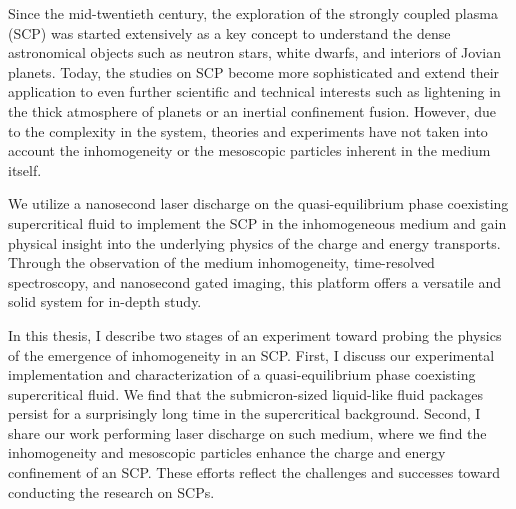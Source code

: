 
Since the mid-twentieth century, the exploration of the strongly coupled plasma (SCP) was started extensively as a key concept to understand the dense astronomical objects such as neutron stars, white dwarfs, and interiors of Jovian planets. Today, the studies on SCP become more sophisticated and extend their application to even further scientific and technical interests such as lightening in the thick atmosphere of planets or an inertial confinement fusion. However, due to the complexity in the system, theories and experiments have not taken into account the inhomogeneity or the mesoscopic particles inherent in the medium itself.

We utilize a nanosecond laser discharge on the quasi-equilibrium phase coexisting supercritical fluid to implement the SCP in the inhomogeneous medium and gain physical insight into the underlying physics of the charge and energy transports. Through the observation of the medium inhomogeneity, time-resolved spectroscopy, and nanosecond gated imaging, this platform offers a versatile and solid system for in-depth study.

In this thesis, I describe two stages of an experiment toward probing the physics of the emergence of inhomogeneity in an SCP. First, I discuss our experimental implementation and characterization of a quasi-equilibrium phase coexisting supercritical fluid. We find that the submicron-sized liquid-like fluid packages persist for a surprisingly long time in the supercritical background. Second, I share our work performing laser discharge on such medium, where we find the inhomogeneity and mesoscopic particles enhance the charge and energy confinement of an SCP. These efforts reflect the challenges and successes toward conducting the research on SCPs.
